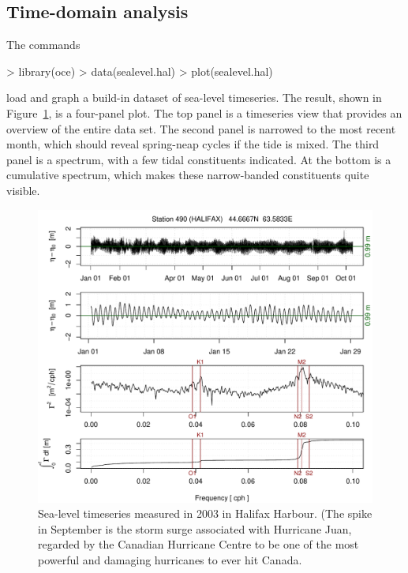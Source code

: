 \documentclass{article}
\begin{document}
\subsection{Time-domain analysis}


The commands
\begin{Schunk}
\begin{Sinput}
> library(oce)
> data(sealevel.hal)
> plot(sealevel.hal)
\end{Sinput}
\end{Schunk}
load and graph a build-in dataset of sea-level timeseries. The result, shown in
Figure~\ref{fig:sealevel}, is a four-panel plot. The top panel is a timeseries
view that provides an overview of the entire data set. The second panel is
narrowed to the most recent month, which should reveal spring-neap cycles if the
tide is mixed. The third panel is a spectrum, with a few tidal constituents
indicated. At the bottom is a cumulative spectrum, which makes these
narrow-banded constituents quite visible.

\begin{figure}
\begin{center}
\includegraphics{oce-sealevelfig}
\end{center}
\caption{Sea-level timeseries measured in 2003 in Halifax Harbour.  (The spike
in September is the storm surge associated with Hurricane Juan, regarded by the
Canadian Hurricane Centre to be one of the most powerful and damaging hurricanes
to ever hit Canada.}
\label{fig:sealevel}
\end{figure}
\end{document}

